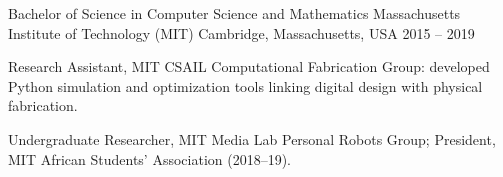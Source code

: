 
\begin{cventries}
\cventry
  {Bachelor of Science in Computer Science and Mathematics}
  {Massachusetts Institute of Technology (MIT)}
  {Cambridge, Massachusetts, USA}
  {2015 -- 2019}
  {
    \begin{cvitems}
      \item {Research Assistant, MIT CSAIL Computational Fabrication Group: developed Python simulation and optimization tools linking digital design with physical fabrication.}
      \item {Undergraduate Researcher, MIT Media Lab Personal Robots Group; President, MIT African Students' Association (2018--19).}
    \end{cvitems}
  }
\end{cventries}

